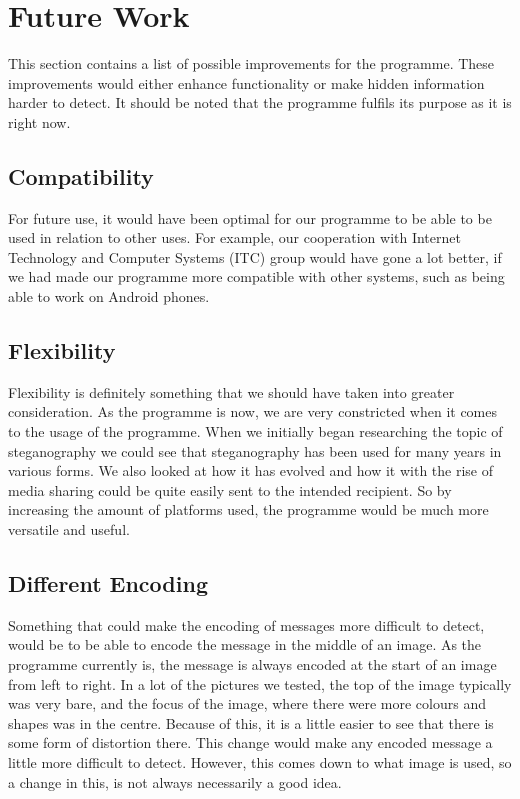 \section{Future Work}
This section contains a list of possible improvements for the programme.
These improvements would either enhance functionality or make hidden information harder to detect.
It should be noted that the programme fulfils its purpose as it is right now.

\subsection*{Compatibility}
For future use, it would have been optimal for our programme to be able to be used in relation to other uses.
For example, our cooperation with Internet Technology and Computer Systems (ITC) group would have gone a lot better, if we had made our programme more compatible with other systems, such as being able to work on Android phones.

\subsection*{Flexibility}
Flexibility is definitely something that we should have taken into greater consideration.
As the programme is now, we are very constricted when it comes to the usage of the programme.
When we initially began researching the topic of steganography we could see that steganography has been used for many years in various forms.
We also looked at how it has evolved and how it with the rise of media sharing could be quite easily sent to the intended recipient.
So by increasing the amount of platforms used, the programme would be much more versatile and useful.

\subsection*{Different Encoding}
Something that could make the encoding of messages more difficult to detect, would be to be able to encode the message in the middle of an image.
As the programme currently is,  the message is always encoded at the start of an image from left to right.
In a lot of the pictures we tested, the top of the image typically was very bare, and the focus of the image, where there were more colours and shapes was in the centre.
Because of this, it is a little easier to see that there is some form of distortion there.
This change would make any encoded message a little more difficult to detect.
However, this comes down to what image is used, so a change in this, is not always necessarily a good idea.

